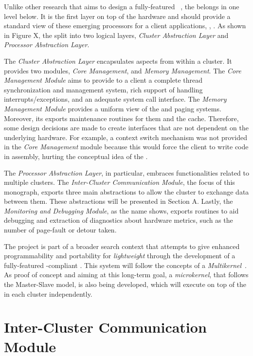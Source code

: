 	Unlike other research that aims to design a fully-featured \os~\cite{},
	the \hal belongs in one level below.
	It is the first layer on top of the hardware and should provide a standard
	view of these emerging processors for a client applications, \ie, \os.
	As shown in Figure X, the \hal split into two logical layers,
	\textit{Cluster Abstraction Layer} and \textit{Processor Abstraction Layer}.

	The \textit{Cluster Abstraction Layer} encapsulates aspects from within a cluster.
	It provides two modules, \textit{Core Management}, and \textit{Memory Management}.
	The \textit{Core Management Module} aims to provide to a client \os a complete
	thread synchronization and management system, rich support of handling
	interrupts/exceptions, and an adequate system call interface.
	The \textit{Memory Management Module} provides a uniform view of the \tlbs
	and paging systems.
	Moreover, its exports maintenance routines for them and the cache.
	Therefore, some design decisions are made to create interfaces that are not
	dependent on the underlying hardware.
	For example, a context switch mechanism was not provided in the
	\textit{Core Management} module because this would force the client \os
	to write code in assembly, hurting the conceptual idea of the \hal.

	The \textit{Processor Abstraction Layer}, in particular, embraces
	functionalities related to multiple clusters.
	The \textit{Inter-Cluster Communication Module}, the focus of
	this monograph, exports three main abstractions to allow the
	cluster to exchange data between them.
	These abstractions will be presented in Section A.
	Lastly, the \textit{Monitoring and Debugging Module}, as the
	name shows, exports routines to aid debugging and extraction
	of diagnostics about hardware metrics, such as the number of
	page-fault or detour taken.

	The \hal project is part of a broader search context that
	attempts to give enhanced programmability and portability
	for \textit{lightweight \manycores} through the development
	of a fully-featured \posix-compliant \os.
	This system will follow the concepts of a \textit{Multikernel}~\cite{}.
	As proof of concept and aiming at this long-term goal,
	a \textit{microkernel}, that follows the Master-Slave model,
	is also being developed, which will execute on top of the \hal
	in each cluster independently.

\section{Inter-Cluster Communication Module}

